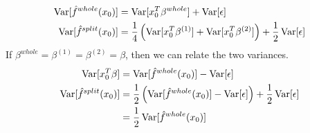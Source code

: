 \begin{align*}
    \operatorname{Var}[\hat{f}^{whole}(x_0)] &= \operatorname{Var}[x_0^T\beta^{whole}] + \operatorname{Var}[\epsilon]\\
    \operatorname{Var}[\hat{f}^{split}(x_0)] &= \frac{1}{4}\left(\operatorname{Var}[x_0^T\beta^{(1)}] + \operatorname{Var}[x_0^T\beta^{(2)}]\right) + \frac{1}{2}\operatorname{Var}[\epsilon]
\end{align*}
If $\beta^{whole} = \beta^{(1)} = \beta^{(2)} = \beta$, then we can relate the two variances.
\begin{align*}
    \operatorname{Var}[x_0^T\beta] &= \operatorname{Var}[\hat{f}^{whole}(x_0)] - \operatorname{Var}[\epsilon] \\
    \operatorname{Var}[\hat{f}^{split}(x_0)] &= \frac{1}{2}\left(\operatorname{Var}[\hat{f}^{whole}(x_0)] - \operatorname{Var}[\epsilon]\right) + \frac{1}{2}\operatorname{Var}[\epsilon]\\
    &= \frac{1}{2}\operatorname{Var}[\hat{f}^{whole}(x_0)]
\end{align*}


